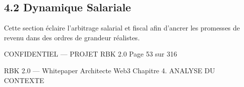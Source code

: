 \subsection{4.2 Dynamique Salariale}
Cette section éclaire l’arbitrage salarial et fiscal afin d’ancrer les promesses de revenu dans des ordres de grandeur réalistes.\\
\vspace{0.5em}
\vspace{0.5em}
\vspace{0.5em}
\vspace{0.5em}
\begin{confidential}CONFIDENTIEL — PROJET RBK 2.0                                               Page 53 sur 316\end{confidential}
RBK 2.0 — Whitepaper Architecte Web3                                                                                        Chapitre 4. ANALYSE DU CONTEXTE\\
\vspace{0.5em}
\vspace{0.5em}
